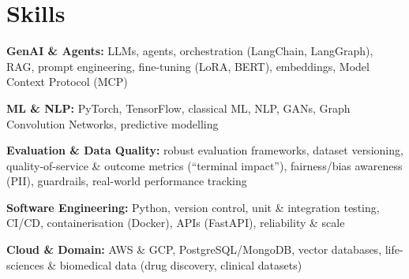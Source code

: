 \documentclass[10pt,a4paper]{article}
\begin{document}
\section{Skills}
\begin{tight}
  \item[\textcolor{accent}{\small$\bullet$}] \textbf{GenAI \& Agents:} LLMs, agents, orchestration (LangChain, LangGraph), RAG, prompt engineering, fine-tuning (LoRA, BERT), embeddings, Model Context Protocol (MCP)
  \item[\textcolor{accent}{\small$\bullet$}] \textbf{ML \& NLP:} PyTorch, TensorFlow, classical ML, NLP, GANs, Graph Convolution Networks, predictive modelling
  \item[\textcolor{accent}{\small$\bullet$}] \textbf{Evaluation \& Data Quality:} robust evaluation frameworks, dataset versioning, quality-of-service \& outcome metrics (``terminal impact''), fairness/bias awareness (PII), guardrails, real-world performance tracking
  \item[\textcolor{accent}{\small$\bullet$}] \textbf{Software Engineering:} Python, version control, unit \& integration testing, CI/CD, containerisation (Docker), APIs (FastAPI), reliability \& scale
  \item[\textcolor{accent}{\small$\bullet$}] \textbf{Cloud \& Domain:} AWS \& GCP, PostgreSQL/MongoDB, vector databases, life-sciences \& biomedical data (drug discovery, clinical datasets)
\end{tight}

\end{document}
